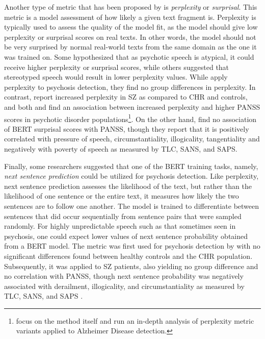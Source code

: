 Another type of metric that has been proposed by \citet{mitchell2015quantifying} is \textit{perplexity} or \textit{surprisal}. This metric is a model assessment of how likely a given text fragment is. Perplexity is typically used to assess the quality of the model fit, as the model should give low perplexity or surprisal scores on real texts. In other words, the model should not be very surprised by normal real-world texts from the same domain as the one it was trained on. Some hypothesized that as psychotic speech is atypical, it could receive higher perplexity or surprisal scores, while others suggested that stereotyped speech would result in lower perplexity values. While \citet{mitchell2015quantifying} apply perplexity to psychosis detection, they find no group differences in perplexity. In contrast, \citet{srivastava2022increased} report increased perplexity in SZ as compared to CHR and controls, and both \citet{vail2018toward} and \citet{girard2022computational} find an association between increased perplexity and higher PANSS scores in psychotic disorder populations\footnote{\cite{colla2022semantic} focus on the method itself and run an in-depth analysis of perplexity metric variants applied to Alzheimer Disease detection.}. On the other hand, \citet{jeong2023exploring} find no association of BERT surprisal scores with PANSS, though they report that it is positively correlated with pressure of speech, circumstantiality, illogicality, tangentiality and negatively with poverty of speech as measured by TLC, SANS, and SAPS.

Finally, some researchers suggested that one of the BERT training tasks, namely, \textit{next sentence prediction} could be utilized for psychosis detection. Like perplexity, next sentence prediction assesses the likelihood of the text, but rather than the likelihood of one sentence or the entire text, it measures how likely the two sentences are to follow one another. The model is trained to differentiate between sentences that did occur sequentially from sentence pairs that were sampled randomly. For highly unpredictable speech such as that sometimes seen in psychosis, one could expect lower values of next sentence probability obtained from a BERT model. The metric was first used for psychosis detection by \citet{hitczenko2021understanding} with no significant differences found between healthy controls and the CHR population. Subsequently, it was applied to SZ patients, also yielding no group difference \citep{tang2021natural} and no correlation with PANSS, though next sentence probability was negatively associated with derailment, illogicality, and circumstantiality as measured by TLC, SANS, and SAPS \citep{jeong2023exploring}.

